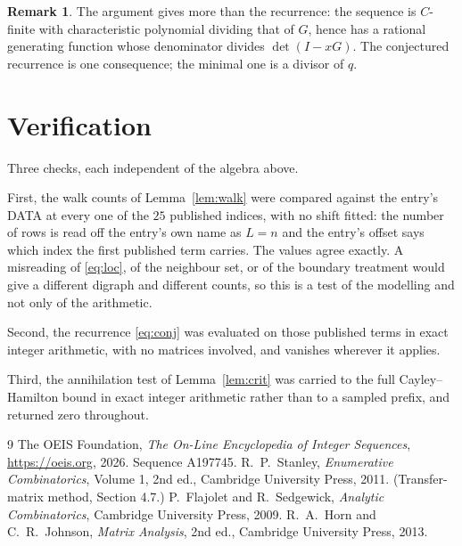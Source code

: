 \documentclass[11pt,a4paper]{article}
\theoremstyle{plain}
\theoremstyle{definition}
\newtheorem{remark}[theorem]{Remark}
\begin{document}
\begin{remark}
The argument gives more than the recurrence: the sequence is $C$-finite with characteristic
polynomial dividing that of $G$, hence has a rational generating function whose denominator
divides $\det(I-xG)$. The conjectured recurrence is one consequence; the minimal one is a
divisor of $q$.
\end{remark}

\section{Verification}

Three checks, each independent of the algebra above.

First, the walk counts of Lemma~\ref{lem:walk} were compared against the entry's DATA at
every one of the $25$ published indices, with no shift fitted: the number of rows is
read off the entry's own name as $L=n$ and the entry's offset says which index the first
published term carries. The values agree exactly. A misreading of \eqref{eq:loc}, of the
neighbour set, or of the boundary treatment would give a different digraph and different
counts, so this is a test of the modelling and not only of the arithmetic.

Second, the recurrence \eqref{eq:conj} was evaluated on those published terms in exact
integer arithmetic, with no matrices involved, and vanishes wherever it applies.

Third, the annihilation test of Lemma~\ref{lem:crit} was carried to the full
Cayley--Hamilton bound in exact integer arithmetic rather than to a sampled prefix, and
returned zero throughout.

\begin{thebibliography}{9}
 The OEIS Foundation, \emph{The On-Line Encyclopedia of Integer
Sequences}, \url{https://oeis.org}, 2026. Sequence A197745.
 R.~P.~Stanley, \emph{Enumerative Combinatorics}, Volume 1, 2nd ed.,
Cambridge University Press, 2011. (Transfer-matrix method, Section 4.7.)
 P.~Flajolet and R.~Sedgewick, \emph{Analytic Combinatorics}, Cambridge
University Press, 2009.
 R.~A.~Horn and C.~R.~Johnson, \emph{Matrix Analysis}, 2nd ed., Cambridge
University Press, 2013.
\end{thebibliography}
\end{document}
